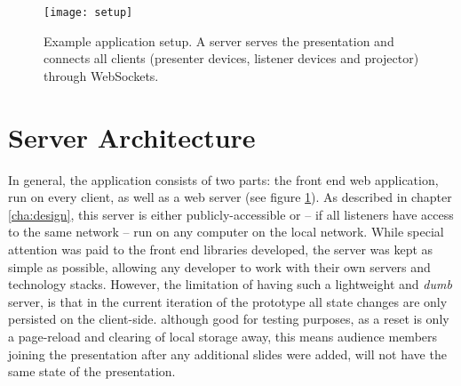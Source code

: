 \begin{figure}
\centering
\texttt{[image: setup]}
\caption{Example application setup. A server serves the presentation and connects all clients (presenter devices, listener devices and projector) through WebSockets.}
\label{fig:implementation-architecture-setup}
\end{figure}

\section{Server Architecture}
\label{sec:implementation-server}

In general, the application consists of two parts: the front end web application, run on every client, as well as a web server (see figure \ref{fig:implementation-architecture-setup}). As described in chapter \ref{cha:design}, this server is either publicly-accessible or -- if all listeners have access to the same network -- run on any computer on the local network. While special attention was paid to the front end libraries developed, the server was kept as simple as possible, allowing any developer to work with their own servers and technology stacks. However, the limitation of having such a lightweight and \emph{dumb} server, is that in the current iteration of the prototype all state changes are only persisted on the client-side. although good for testing purposes, as a reset is only a page-reload and clearing of local storage away, this means audience members joining the presentation after any additional slides were added, will not have the same state of the presentation.


